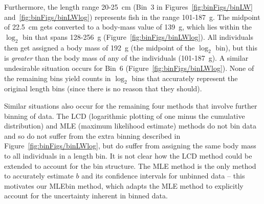 \documentclass[12pt, letter]{article}
\newcommand{\logtwo}{\log_{\mathrm{2}}}
\newcommand{\MEE}{erpbb17}     %
\begin{document}
Furthermore, the length range 20-25~cm (Bin~3 in Figures~\ref{fig:binFigs/binLW}
and~\ref{fig:binFigs/binLWlog}) represents fish in the range 101-187~g.  The
midpoint of 22.5~cm gets converted to a body-mass value of 139~g, which lies
within the $\logtwo$ bin that spans 128-256~g
(Figure~\ref{fig:binFigs/binLWlog}). All individuals then get assigned a body
mass of 192~g (the midpoint of the $\logtwo$ bin), but this is \emph{greater}
than the body mass of any of the individuals (101-187~g).  A similar undesirable
situation occurs for Bin~6 (Figure~\ref{fig:binFigs/binLWlog}).  None of the
remaining bins yield counts in $\logtwo$ bins that accurately represent the
original length bins (since there is no reason that they should).



Similar situations also occur for the remaining four methods that involve
further binning of data.
The LCD (logarithmic plotting of one minus the cumulative distribution) and
MLE (maximum likelihood estimate)
methods do not bin data and so do not
suffer from the extra binning described in Figure~\ref{fig:binFigs/binLWlog},
but do suffer from assigning the same body mass to all individuals in a
length bin.
It is not clear how the LCD method could be extended to account for the bin
structure. The
MLE method is the only method to accurately estimate $b$ and its confidence
intervals for unbinned data \citep{\MEE} --
this motivates our MLEbin
method, which adapts the MLE method to explicitly account for the uncertainty
inherent in binned data.
\end{document}
